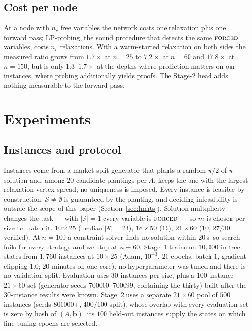 \documentclass[final,5p,times,twocolumn]{elsarticle}
\newcommand{\SOL}{\mathcal{S}}
\newcommand{\FORCED}{\textsc{forced}}
\begin{document}
\subsection{Cost per node}
\label{sec:method-cost}

At a node with $n_c$ free variables the network costs one relaxation plus one forward pass; LP-probing, the sound procedure that detects the same $\FORCED$ variables, costs $n_c$ relaxations. With a warm-started relaxation on both sides the measured ratio grows from $1.7\times$ at $n=25$ to $7.2\times$ at $n=60$ and $17.8\times$ at $n=150$, but is only $1.3$--$1.7\times$ at the depths where prediction matters on our instances, where probing additionally yields proofs. The Stage-2 head adds nothing measurable to the forward pass.

\section{Experiments}
\label{sec:exp}

\subsection{Instances and protocol}
\label{sec:exp-protocol}

Instances come from a market-split generator that plants a random $n/2$-of-$n$ solution and, among $20$ candidate plantings per $A$, keeps the one with the largest relaxation-vertex spread; no uniqueness is imposed. Every instance is feasible by construction: $\SOL\neq\emptyset$ is guaranteed by the planting, and deciding infeasibility is outside the scope of this paper (Section~\ref{sec:limits}). Solution multiplicity changes the task --- with $|\SOL|=1$ every variable is $\FORCED$ --- so $m$ is chosen per size to match it: $10\times25$ (median $|\SOL|=23$), $18\times50$ ($19$), $21\times60$ ($10$; $27/30$ verified). At $n=100$ a constraint solver finds no solution within $20$\,s, so search fails for every strategy and we stop at $n=60$. Stage~1 trains on $10{,}000$ in-tree states from $1{,}760$ instances at $10\times25$ (Adam, $10^{-3}$, $20$ epochs, batch $1$, gradient clipping $1.0$; $20$ minutes on one core); no hyperparameter was tuned and there is no validation split. Evaluation uses $30$ instances per size, plus a $100$-instance $21\times60$ set (generator seeds $700000$--$700099$, containing the thirty) built after the $30$-instance results were known. Stage~2 uses a separate $21\times60$ pool of $500$ instances (seeds $800000$+, $400/100$ split), whose overlap with every evaluation set is zero by hash of $(A,\mathbf{b})$; its $100$ held-out instances supply the states on which fine-tuning epochs are selected.
\end{document}

